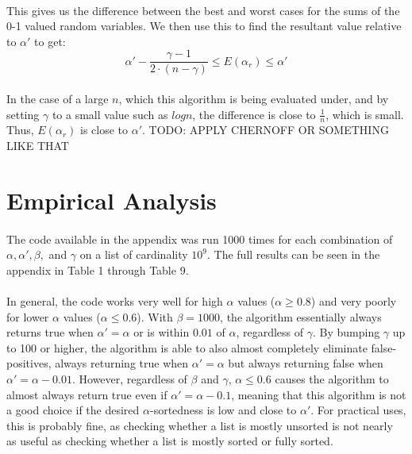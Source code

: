 \documentclass{article}
\begin{document}
\paragraph{}This gives us the difference between the best and worst cases for the sums of the 0-1 valued random variables. We then use this to find the resultant value relative to $\alpha'$ to get:
\begin{equation*}
\alpha' - \frac{\gamma - 1}{2 \cdot (n - \gamma)} \leq E(\alpha_{r}) \leq \alpha'
\end{equation*}
\paragraph{}In the case of a large $n$, which this algorithm is being evaluated under, and by setting $\gamma$ to a small value such as $logn$, the difference is close to $\frac{1}{n}$, which is small. Thus, $E(\alpha_{r})$ is close to $\alpha'$. TODO: APPLY CHERNOFF OR SOMETHING LIKE THAT
\section{Empirical Analysis}
\paragraph{}The code available in the appendix was run 1000 times for each combination of $\alpha, \alpha', \beta,$ and $\gamma$ on a list of cardinality $10^9$. The full results can be seen in the appendix in Table 1 through Table 9.
\paragraph{}In general, the code works very well for high $\alpha$ values ($\alpha \geq 0.8$) and very poorly for lower $\alpha$ values ($\alpha \leq 0.6$). With $\beta = 1000$, the algorithm essentially always returns true when $\alpha' = \alpha$ or is within $0.01$ of $\alpha$, regardless of $\gamma$.
By bumping $\gamma$ up to 100 or higher, the algorithm is able to also almost completely eliminate false-positives, always returning true when $\alpha'=\alpha$ but always returning false when $\alpha'=\alpha-0.01$.
However, regardless of $\beta$ and $\gamma$, $\alpha \leq 0.6$ causes the algorithm to almost always return true even if $\alpha' = \alpha - 0.1$, meaning that this algorithm is not a good choice if the desired $\alpha$-sortedness is low and close to $\alpha'$.
For practical uses, this is probably fine, as checking whether a list is mostly unsorted is not nearly as useful as checking whether a list is mostly sorted or fully sorted.
\end{document}
